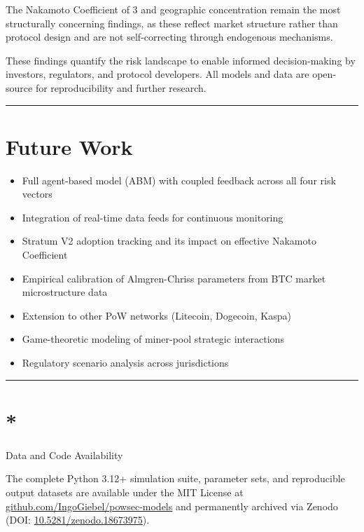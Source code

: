 \documentclass[
  11pt,
]{article}
\providecommand{\tightlist}{%
  \setlength{\itemsep}{0pt}\setlength{\parskip}{0pt}}\usepackage{longtable,booktabs,array}
\let\oldsection\section
\renewcommand{\section}[1]{\FloatBarrier\oldsection{#1}}
\begin{document}
The Nakamoto Coefficient of 3 and geographic concentration remain the
most structurally concerning findings, as these reflect market structure
rather than protocol design and are not self-correcting through
endogenous mechanisms.

These findings quantify the risk landscape to enable informed
decision-making by investors, regulators, and protocol developers. All
models and data are open-source for reproducibility and further
research.

\begin{center}\rule{0.5\linewidth}{0.5pt}\end{center}

\hypertarget{future-work}{%
\section{Future Work}\label{future-work}}

\begin{itemize}
\tightlist
\item
  Full agent-based model (ABM) with coupled feedback across all four
  risk vectors
\item
  Integration of real-time data feeds for continuous monitoring
\item
  Stratum V2 adoption tracking and its impact on effective Nakamoto
  Coefficient
\item
  Empirical calibration of Almgren-Chriss parameters from BTC market
  microstructure data
\item
  Extension to other PoW networks (Litecoin, Dogecoin, Kaspa)
\item
  Game-theoretic modeling of miner-pool strategic interactions
\item
  Regulatory scenario analysis across jurisdictions
\end{itemize}

\begin{center}\rule{0.5\linewidth}{0.5pt}\end{center}

\hypertarget{data-and-code-availability}{%
\section*{Data and Code Availability}\label{data-and-code-availability}}

The complete Python 3.12+ simulation suite, parameter sets, and
reproducible output datasets are available under the MIT License at
\href{https://github.com/IngoGiebel/powsec-models}{github.com/IngoGiebel/powsec-models}
and permanently archived via Zenodo (DOI:
\href{https://doi.org/10.5281/zenodo.18673975}{10.5281/zenodo.18673975}).
\end{document}
